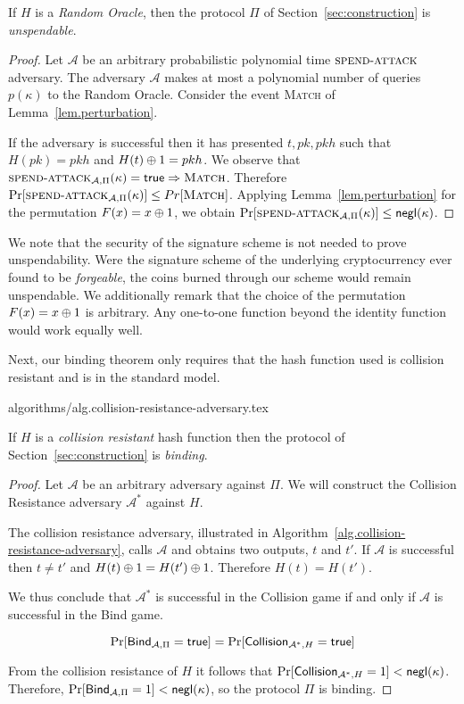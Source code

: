 \begin{theorem}[Unspendability]
  If $H$ is a \emph{Random Oracle}, then the protocol $\Pi$ of Section~\ref{sec:construction} is \emph{unspendable}.
\end{theorem}
\begin{proof}
  Let $\mathcal{A}$ be an arbitrary probabilistic polynomial time $\textsc{spend}\-\text{-}\-\textsc{attack}$ adversary.
  The adversary $\mathcal{A}$ makes at most a polynomial number of queries $p(\kappa)$ to the Random Oracle.
  Consider the event \textsc{Match} of Lemma~\ref{lem.perturbation}.

  If the adversary is successful then it has presented $t, pk, pkh$ such that $H(pk) = pkh$ and $H(t) \oplus 1 = pkh$.
  We observe that $\textsc{spend}\-\text{-}\-\textsc{attack}_{\mathcal{A}, \Pi}(\kappa) = \mathsf{true} \Rightarrow \textsc{Match}$.
  Therefore $\Pr[\textsc{spend}\-\text{-}\-\textsc{attack}_{\mathcal{A}, \Pi}(\kappa)] \leq Pr[\textsc{Match}]$. Applying Lemma~\ref{lem.perturbation} for the permutation $F(x) = x \oplus 1$,
  we obtain
  $\Pr[\textsc{spend}\-\text{-}\-\textsc{attack}_{\mathcal{A}, \Pi}(\kappa)] \leq \textsf{negl}(\kappa)$.
\end{proof}

We note that the security of the signature scheme is not needed to prove unspendability. Were the signature scheme of the underlying cryptocurrency ever found to be \emph{forgeable}, the coins burned through our scheme would remain unspendable. We additionally remark that the
choice of the permutation $F(x) = x \oplus 1$ is arbitrary. Any one-to-one
function beyond the identity function would work equally well.

Next, our binding theorem only requires that the hash function used is collision
resistant and is in the standard model.

{algorithms/alg.collision-resistance-adversary.tex}

\begin{theorem}[Binding]
  If $H$ is a \emph{collision resistant} hash function then the protocol of Section~\ref{sec:construction} is \emph{binding}.
\end{theorem}
\begin{proof}
  Let $\mathcal{A}$ be an arbitrary adversary against $\Pi$.
  We will construct the Collision Resistance adversary $\mathcal{A}^*$ against $H$.

  The collision resistance adversary, illustrated in Algorithm~\ref{alg.collision-resistance-adversary}, calls $\mathcal{A}$ and obtains two outputs, $t$ and $t'$. If $\mathcal{A}$ is successful then $t \neq t'$ and $H(t) \oplus 1 = H(t') \oplus 1$. Therefore $H(t) = H(t')$.

  We thus conclude that $\mathcal{A^*}$ is successful in the \textsf{Collision} game if and only if $\mathcal{A}$ is successful in the \textsf{Bind} game.

  \[
    \Pr[\textsf{Bind}_{\mathcal{A},\Pi} = \mathsf{true}]
    =
    \Pr[\textsf{Collision}_{\mathcal{A}^*,H} = \mathsf{true}]
  \]

  From the collision resistance of $H$ it follows that $\Pr[\textsf{Collision}_{\mathcal{A}^*,H} = 1] < \textsf{negl}(\kappa)$. Therefore,
  $\Pr[\textsf{Bind}_{\mathcal{A},\Pi} = 1] < \textsf{negl}(\kappa)$, so
  the protocol $\Pi$ is binding.
\end{proof}

